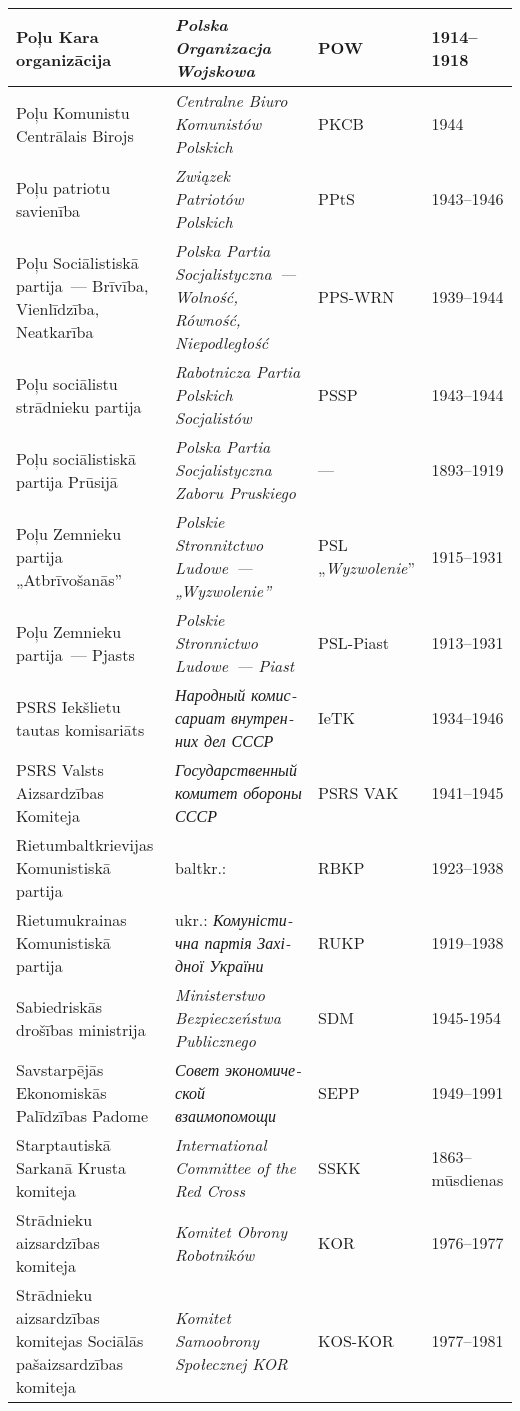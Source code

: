 \documentclass[twoside,a5paper,12pt,fleqn,openany]{extbook}
\newcommand{\pltxti}[1]{\textit{\textpolish{#1}}}
\newcommand{\rutxti}[1]{\textit{\textrussian{#1}}}
\newcommand{\entxti}[1]{\textit{\textenglish{#1}}}
\newcommand{\betxti}[1]{\textit{\textbelarusian{#1}}}
\newcommand{\uktxti}[1]{\textit{\textukrainian{#1}}}
\begin{document}
\begin{footnotesize}
\begin{tabularx}{\linewidth}{|p{3cm}|p{3.5cm}|p{1.4cm}|p{1.6cm}|}
\hline
Poļu Kara organizācija & \pltxti{Polska Organizacja Wojskowa} & POW & 1914--1918 \\
\hline
Poļu Komunistu Centrālais Birojs & \pltxti{Centralne Biuro Komunistów Polskich} & PKCB & 1944 \\
\hline
Poļu patriotu savienība & \pltxti{Związek Patriotów Polskich} & PPtS & 1943--1946 \\
\hline
Poļu Sociālistiskā partija~--- Brīvība, Vienlīdzība, Neatkarība & \pltxti{Polska Partia Socjalistyczna~--- Wolność, Równość, Niepodległość} & PPS-WRN & 1939--1944 \\
\hline
Poļu sociālistu strādnieku partija & \pltxti{Rabotnicza Partia Polskich Socjalistów} & PSSP & 1943--1944 \\
\hline
Poļu sociālistiskā partija Prūsijā & \pltxti{Polska Partia Socjalistyczna Zaboru Pruskiego} & --- & 1893--1919 \\
\hline
Poļu Zemnieku partija „Atbrīvošanās” & \pltxti{Polskie Stronnitctwo Ludowe~--- „Wyzwolenie”} & PSL „\pltxti{Wyzwolenie}” & 1915--1931 \\
\hline
Poļu Zemnieku partija~--- Pjasts & \pltxti{Polskie Stronnictwo Ludowe~--- Piast} & PSL-Piast & 1913--1931 \\
\hline
PSRS Iekšlietu tautas komisariāts & \rutxti{Народный комиссариат внутренних дел СССР} & IeTK & 1934--1946 \\
\hline
PSRS Valsts Aizsardzības Komiteja & \rutxti{Государственный комитет обороны СССР} & PSRS VAK & 1941--1945 \\
\hline
Rietumbaltkrievijas Komunistiskā partija & baltkr.: \betxti{Камуністычная партыя Заходняй Беларусі} & RBKP & 1923--1938 \\
\hline
Rietumukrainas Komunistiskā partija & ukr.: \uktxti{Комуністична партія Західної України} & RUKP & 1919--1938 \\
\hline
Sabiedriskās drošības ministrija & \pltxti{Ministerstwo Bezpieczeństwa Publicznego} & SDM & 1945-1954 \\
\hline
Savstarpējās Ekonomiskās Palīdzības Padome & \rutxti{Совет экономической взаимопомощи} & SEPP & 1949--1991 \\
\hline
Starptautiskā Sarkanā Krusta komiteja & \entxti{International Committee of the Red Cross} & SSKK & 1863--mūsdienas \\
\hline
Strādnieku aizsardzības komiteja & \pltxti{Komitet Obrony Robotników} & KOR & 1976--1977 \\
\hline
Strādnieku aizsardzības komitejas Sociālās pašaizsardzības komiteja & \pltxti{Komitet Samoobrony Społecznej KOR} & KOS-KOR & 1977--1981 \\

\end{tabularx}
\end{footnotesize}
\end{document}
